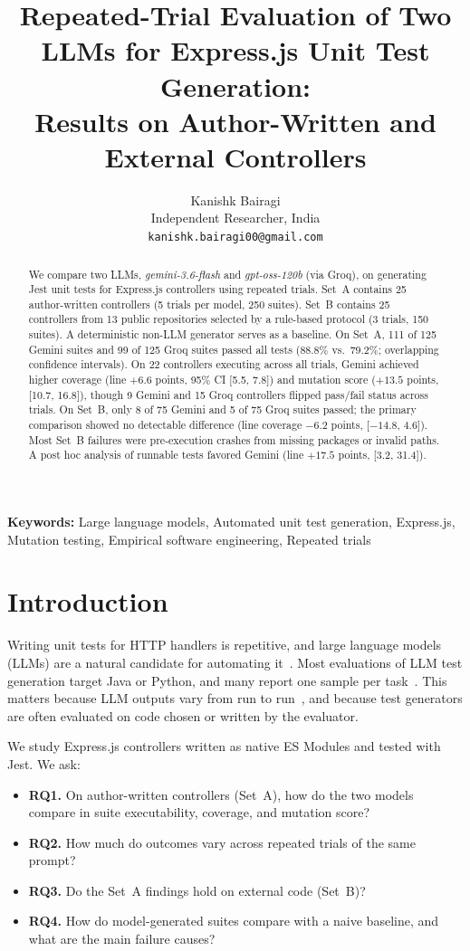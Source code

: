 \documentclass[11pt]{article}
\title{Repeated-Trial Evaluation of Two LLMs for Express.js Unit Test Generation:\\ Results on Author-Written and External Controllers}
\author{Kanishk Bairagi\\Independent Researcher, India\\\texttt{kanishk.bairagi00@gmail.com}}
\begin{document}
\maketitle
\linenumbers

\begin{abstract}
We compare two LLMs, \textit{gemini-3.6-flash} and \textit{gpt-oss-120b} (via Groq), on generating Jest unit tests for Express.js controllers using repeated trials. Set~A contains 25 author-written controllers (5 trials per model, 250 suites). Set~B contains 25 controllers from 13 public repositories selected by a rule-based protocol (3 trials, 150 suites). A deterministic non-LLM generator serves as a baseline. On Set~A, 111 of 125 Gemini suites and 99 of 125 Groq suites passed all tests (88.8\% vs.\ 79.2\%; overlapping confidence intervals). On 22 controllers executing across all trials, Gemini achieved higher coverage (line $+6.6$ points, 95\% CI [5.5, 7.8]) and mutation score ($+13.5$ points, [10.7, 16.8]), though 9 Gemini and 15 Groq controllers flipped pass/fail status across trials. On Set~B, only 8 of 75 Gemini and 5 of 75 Groq suites passed; the primary comparison showed no detectable difference (line coverage $-6.2$ points, [$-14.8$, 4.6]). Most Set~B failures were pre-execution crashes from missing packages or invalid paths. A post hoc analysis of runnable tests favored Gemini (line $+17.5$ points, [3.2, 31.4]).
\end{abstract}

\smallskip
\noindent\textbf{Keywords:} Large language models, Automated unit test generation, Express.js, Mutation testing, Empirical software engineering, Repeated trials

\section{Introduction}
Writing unit tests for HTTP handlers is repetitive, and large language models (LLMs) are a natural candidate for automating it~\cite{wang2024survey}. Most evaluations of LLM test generation target Java or Python, and many report one sample per task~\cite{yuan2023chatgpt,siddiq2024junit,yang2024evaluation}. This matters because LLM outputs vary from run to run~\cite{ouyang2023nondeterminism}, and because test generators are often evaluated on code chosen or written by the evaluator.

We study Express.js controllers written as native ES Modules and tested with Jest. We ask:
\begin{itemize}
\item \textbf{RQ1.} On author-written controllers (Set~A), how do the two models compare in suite executability, coverage, and mutation score?
\item \textbf{RQ2.} How much do outcomes vary across repeated trials of the same prompt?
\item \textbf{RQ3.} Do the Set~A findings hold on external code (Set~B)?
\item \textbf{RQ4.} How do model-generated suites compare with a naive baseline, and what are the main failure causes?
\end{itemize}
\end{document}
